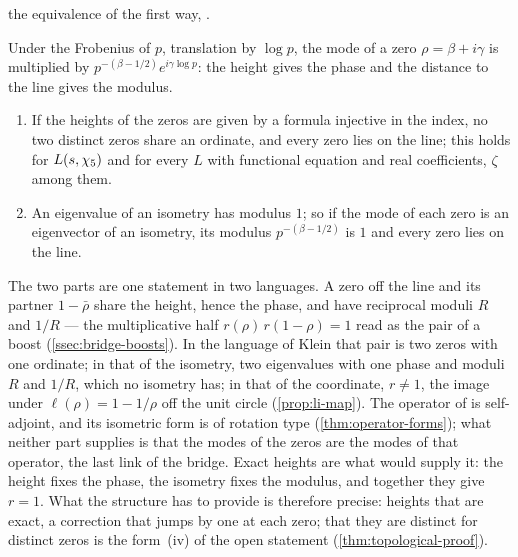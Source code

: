 the equivalence of the first way, .

\begin{proposition}\label{prop:phase-modulus}
Under the Frobenius of $p$, translation by $\log p$, the mode of a zero $\rho=\beta+i\gamma$ is
multiplied by $p^{-(\beta-1/2)}e^{i\gamma\log p}$: the height gives the phase and the distance to the
line gives the modulus.
\begin{enumerate}[label=\textup{(\roman*)}]
  \item If the heights of the zeros are given by a formula injective in the index, no two distinct
    zeros share an ordinate, and every zero lies on the line; this holds for $L(s,\chi_5)$ and for
    every $L$ with functional equation and real coefficients, $\zeta$ among them.
  \item An eigenvalue of an isometry has modulus $1$; so if the mode of each zero is an eigenvector
    of an isometry, its modulus $p^{-(\beta-1/2)}$ is $1$ and every zero lies on the line.
\end{enumerate}

\end{proposition}

The two parts are one statement in two languages.  A zero off the line and its partner
$1-\bar\rho$ share the height, hence the phase, and have reciprocal moduli $R$ and $1/R$ --- the
multiplicative half $r(\rho)\,r(1-\rho)=1$ read as the pair of a boost (\cref{ssec:bridge-boosts}).
In the language of Klein that pair is two zeros with one ordinate; in that of the isometry, two
eigenvalues with one phase and moduli $R$ and $1/R$, which no isometry has; in that of the
coordinate, $r\neq1$, the image under $\ell(\rho)=1-1/\rho$ off the unit circle (\cref{prop:li-map}).
The operator of \cite{gonzalez25hp} is self-adjoint, and its isometric form is of rotation type
(\cref{thm:operator-forms}); what neither part supplies is that the modes of the zeros are the
modes of that operator, the last link of the bridge.  Exact heights are what would supply it: the
height fixes the phase, the isometry fixes the modulus, and together they give $r=1$.  What the structure has to provide is therefore precise: heights that are exact, a correction
that jumps by one at each zero; that they are distinct for distinct zeros is the form~(iv) of the open
statement (\cref{thm:topological-proof}).

